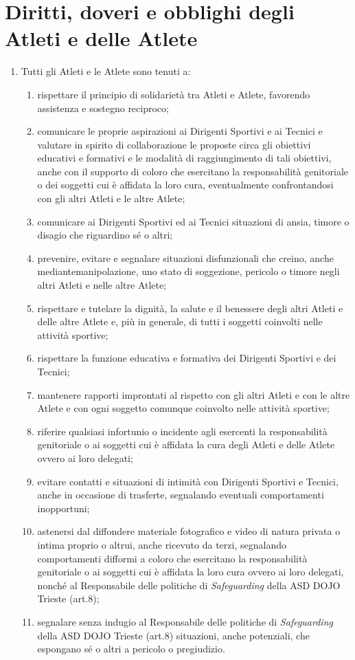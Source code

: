 \documentclass{djtsdoc}
\begin{document}
	\section{Diritti, doveri e obblighi degli Atleti e delle Atlete}
	\begin{enumerate}
		\item Tutti gli Atleti e le Atlete sono tenuti a:
		\begin{enumerate}
			\item rispettare il principio di solidarietà tra Atleti e Atlete, favorendo assistenza e sostegno reciproco;
			\item comunicare le proprie aspirazioni ai Dirigenti Sportivi e ai Tecnici e valutare in spirito di	collaborazione le proposte circa gli obiettivi educativi e formativi e le modalità di 	raggiungimento di tali obiettivi, anche con il supporto di coloro che esercitano la responsabilità genitoriale o dei soggetti cui è affidata la loro cura, eventualmente confrontandosi con gli altri Atleti e le altre Atlete;
			\item comunicare ai Dirigenti Sportivi ed ai Tecnici situazioni di ansia, timore o disagio che 	riguardino sé o altri;
			\item prevenire, evitare e segnalare situazioni disfunzionali che creino, anche mediantemanipolazione, uno stato di soggezione, pericolo o timore negli altri Atleti e nelle altre Atlete;
			\item rispettare e tutelare la dignità, la salute e il benessere degli altri Atleti e delle altre Atlete e, più 	in generale, di tutti i soggetti coinvolti nelle attività sportive;
			\item rispettare la funzione educativa e formativa dei Dirigenti Sportivi e dei Tecnici;
			\item mantenere rapporti improntati al rispetto con gli altri Atleti e con le altre Atlete e con ogni	soggetto comunque coinvolto nelle attività sportive;
			\item riferire qualsiasi infortunio o incidente agli esercenti la responsabilità genitoriale o ai soggetti	cui è affidata la cura degli Atleti e delle Atlete ovvero ai loro delegati;
			\item evitare contatti e situazioni di intimità con Dirigenti Sportivi e Tecnici, anche in occasione di	trasferte, segnalando eventuali comportamenti inopportuni;
			\item astenersi dal diffondere materiale fotografico e video di natura privata o intima proprio o altrui, anche ricevuto da terzi, segnalando comportamenti difformi a coloro che esercitano la	responsabilità genitoriale o ai soggetti cui è affidata la loro cura ovvero ai loro delegati, nonché al Responsabile delle politiche di \textit{Safeguarding} della ASD DOJO Trieste (art.8);
			\item segnalare senza indugio al Responsabile delle politiche di \textit{Safeguarding} della ASD DOJO	Trieste (art.8) situazioni, anche potenziali, che espongano sé o altri a pericolo o pregiudizio.
		\end{enumerate}
	\end{enumerate}
	
\end{document}
